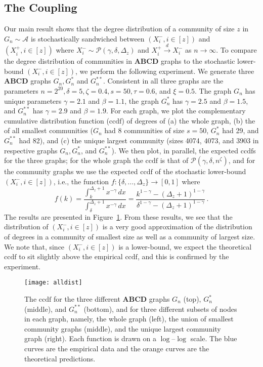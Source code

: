 \documentclass[12pt]{article}
\theoremstyle{definition}
\theoremstyle{remark}
\theoremstyle{remark}
\numberwithin{theorem}{section}
\newcommand{\abcdDist}{\ensuremath{\mathcal{A}}}
\newcommand{\tpl}[3]{\ensuremath{\mathcal{P}\left(#1,#2,#3\right)}}
\begin{document}
\subsection{The Coupling}

Our main result shows that the degree distribution of a community of size $z$ in $G_n \sim \abcdDist$ is stochastically sandwiched between $(X_i^-, i \in [z])$ and $(X_i^+, i \in [z])$ where $X_i^- \sim \tpl{\gamma}{\delta}{\Delta_z}$ and $X_i^+ \stackrel{d}{\to} X_i^-$ as $n \to \infty$. To compare the degree distribution of communities in \textbf{ABCD} graphs to the stochastic lower-bound $(X_i^-, i \in [z])$, we perform the following experiment. We generate three \textbf{ABCD} graphs $G_n, G_n^*$ and $G_n^{**}$. Consistent in all three graphs are the parameters $n = 2^{20}, \delta = 5, \zeta = 0.4, s = 50, \tau = 0.6$, and $\xi = 0.5$. The graph $G_n$ has unique parameters $\gamma = 2.1$ and $\beta = 1.1$, the graph $G_n^*$ has $\gamma = 2.5$ and $\beta = 1.5$, and $G_n^{**}$ has $\gamma = 2.9$ and $\beta = 1.9$. For each graph, we plot the complementary cumulative distribution function ($\mathrm{ccdf}$) of degrees of (a) the whole graph, (b) the of all smallest communities ($G_n$ had 8 communities of size $s=50$, $G_n^*$ had 29, and $G_n^{**}$ had 82), and (c) the unique largest community (sizes 4074, 4073, and 3903 in respective graphs $G_n,G_n^*$, and $G_n^{**}$). We then plot, in parallel, the expected $\mathrm{ccdf}$s for the three graphs; for the whole graph the $\mathrm{ccdf}$ is that of $\tpl{\gamma}{\delta}{n^\zeta}$, and for the community graphs we use the expected $\mathrm{ccdf}$ of the stochastic lower-bound $(X_i^-, i \in [z])$, i.e., the function $f:\{\delta,\dots,\Delta_z\} \to [0,1]$ where
\[
f(k) 
=
\frac{\int_k^{\Delta_z+1} x^{-\gamma} \, dx}{\int_\delta^{\Delta_z+1} x^{-\gamma} \, dx} 
=
\frac{k^{1-\gamma} - (\Delta_z+1)^{1-\gamma}}{\delta^{1-\gamma} - (\Delta_z+1)^{1-\gamma}} \,.
\]
The results are presented in Figure~\ref{fig:dist}. From these results, we see that the distribution of $(X_i^-, i \in [z])$ is a very good approximation of the distribution of degrees in a community of smallest size as well as a community of largest size. We note that, since $(X_i^-, i \in [z])$ is a lower-bound, we expect the theoretical $\mathrm{ccdf}$ to sit slightly above the empirical $\mathrm{ccdf}$, and this is confirmed by the experiment.

\begin{figure}
\begin{center}
    \texttt{[image: alldist]}
\end{center}
\caption{The $\mathrm{ccdf}$ for the three different \textbf{ABCD} graphs $G_n$ (top), $G_n^{*}$ (middle), and $G_n^{**}$ (bottom), and for three different subsets of nodes in each graph, namely, the whole graph (left), the union of smallest community graphs (middle), and the unique largest community graph (right). Each function is drawn on a $\log$--$\log$ scale. The blue curves are the empirical data and the orange curves are the theoretical predictions. \label{fig:dist}}
\end{figure}
\end{document}
